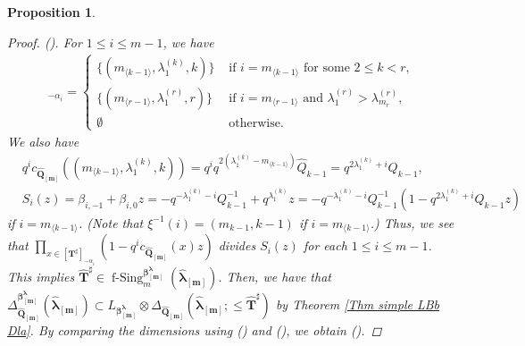 \documentclass[12pt]{amsart}
\newtheorem{prop}[thm]{Proposition}
\numberwithin{equation}{thm}
\newcommand\bQ{\mathbf Q}
\newcommand\bT{\mathbf T}
\renewcommand\bm{\mathbf m} %
\renewcommand\a{\alpha}  %
\renewcommand\b{\beta}   %
\newcommand\la{\lambda}
\newcommand\D{\Delta}
\newcommand\Bb{\boldsymbol\beta}
\newcommand\Bla{\boldsymbol\lambda}
\newcommand\wh{\widehat}
\newcommand\lan{\langle}
\newcommand\ran{\rangle}
\newcommand{\fSing}{\operatorname{f-Sing}}
\newcounter{ichi}
\newcommand{\roi}{\roman{ichi}}
\newcounter{ni}
\newcommand{\roii}{\roman{ni}}
\newcounter{san}
\newcommand{\roiii}{\roman{san}}
\begin{document}
\begin{prop}
\begin{proof}
(\roiii). 
For $1 \leq i \leq m-1$, we have 
\begin{align*}
[\wh{\bT}^{\sharp}]_{-\a_i} = 
\begin{cases}
\{ (m_{\lan k-1 \ran}, \la_1^{(k)}, k) \} & \text{ if } i = m_{\lan k -1 \ran} \text{ for some } 2 \leq k <r,   
\\
\{ (m_{\lan r-1 \ran}, \la_1^{(r)}, r) \} & \text{ if } i=m_{\lan r-1 \ran} \text{ and } \la_1^{(r)} > \la_{m_r}^{(r)}, 
\\
\emptyset & \text{ otherwise}.
\end{cases}
\end{align*}
We also have 
\begin{align*}
&q^i c_{\wh{\bQ}_{[\bm]}}((m_{\lan k-1 \ran}, \la_1^{(k)}, k)) 
	= q^i q^{ 2 (\la_1^{(k)} - m_{\lan k-1 \ran})} \wh{Q}_{k-1} = q^{2 \la_1^{(k)} + i}  Q_{k-1}, 
\\
& S_i(z) = \b_{i,-1} + \b_{i,0} z = - q^{-\la_1^{(k)} -i} Q_{k-1}^{-1} + q^{\la_1^{(k)}} z
	= - q^{-\la_1^{(k)} -i} Q_{k-1}^{-1} ( 1 - q^{2 \la_1^{(k)} +i} Q_{k-1} z) 
\end{align*}
if $i= m_{\lan k-1 \ran} $. 
(Note that $ \xi^{-1} (i) = (m_{k-1}, k-1)$ if $i=m_{\lan k-1 \ran}$.)  
Thus, we see that $\prod_{x \in [\bT^{\sharp}]_{-\a_i}} (1 - q^i c_{\wh{\bQ}_{[\bm]}} (x) z)$ 
divides $S_i(z)$ for each $1 \leq i \leq m-1$. 
This implies $\wh{\bT}^{\sharp} \in \fSing_m^{\Bb_{[\bm]}^{\Bla}} (\wh{\Bla}_{[\bm]})$. 
Then, we have that 
 $\D_{\wh{\bQ}_{[\bm]}}^{\Bb^{\Bla}_{[\bm]}} (\wh{\Bla}_{[\bm]}) 
 \subset L_{\Bb_{[\bm]}^{\Bla}} \otimes \D_{\wh{\bQ}_{[\bm]}}(\wh{\Bla}_{[\bm]} ; \leq \wh{\bT}^{\sharp})$ 
by Theorem \ref{Thm simple LBb Dla}. 
By comparing the dimensions using (\roi) and (\roii), 
we obtain (\roiii). 
\end{proof}
\end{prop} 




\end{document}
